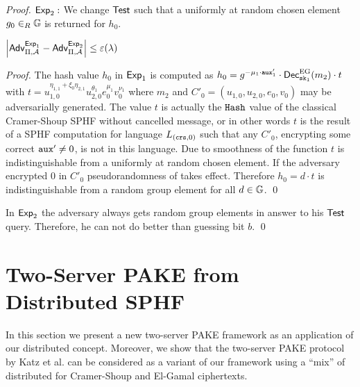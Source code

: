 \begin{proof}
\noindent$\mathsf{Exp}_2:$
We change $\mathsf{Test}$ such that a uniformly at random chosen element $g_0\in_R\mathbb{G}$ is returned for $h_0$.

\begin{claim}
$\left|\mathsf{Adv}_{\Pi,\mathcal{A}}^{\mathsf{Exp}_1}-\mathsf{Adv}_{\Pi,\mathcal{A}}^{\mathsf{Exp}_2}\right|\leq\varepsilon(\lambda)$
\end{claim}

\begin{proof}
The hash value $h_0$ in $\mathsf{Exp}_1$ is computed as $h_0=g^{-\mu_1\cdot\mathtt{aux}'_1}\cdot\mathsf{Dec}_{\mathtt{sk}_1}^{\mathrm{EG}}(m_2)\cdot t$ with $t=u_{1,0}^{\eta_{1,1}+\xi_0\eta_{2,1}}u_{2,0}^{\theta_1}\allowbreak e_0^{\mu_1}v_0^{\nu_1}$ where $m_2$ and $C'_0=(u_{1,0}, u_{2,0},\allowbreak e_0, v_0)$ may be adversarially generated.
The value $t$ is actually the $\mathtt{Hash}$ value of the classical Cramer-Shoup SPHF without cancelled message, or in other words $t$ is the result of a SPHF \Hash computation for language $L_{(\mathtt{crs},0)}$ such that any $C'_0$, encrypting some correct $\mathtt{aux}'\not=0$, is not in this language.
Due to smoothness of the \Hash function \cite{Benhamouda2013} $t$ is indistinguishable from a uniformly at random chosen element.
If the adversary encrypted $0$ in $C'_0$ pseudorandomness of \Hash takes effect.
Therefore $h_0=d\cdot t$ is indistinguishable from a random group element for all $d\in\mathbb{G}$.
\qed
\end{proof}

\noindent
In $\mathsf{Exp}_2$ the adversary always gets random group elements in answer to his $\mathsf{Test}$ query.
Therefore, he can not do better than guessing bit $b$.
\qed
\end{proof}

\section{Two-Server PAKE from Distributed SPHF}\label{sec:twoserverpake}
In this section we present a new two-server PAKE framework as an application of our distributed \SPHFF concept.
Moreover, we show that the two-server PAKE protocol by Katz et al. \cite{Katz_MacKenzie_Taban_Gligor_2005} can be considered as a variant of our framework using a ``mix'' of distributed \SPHFF for Cramer-Shoup and El-Gamal ciphertexts.

